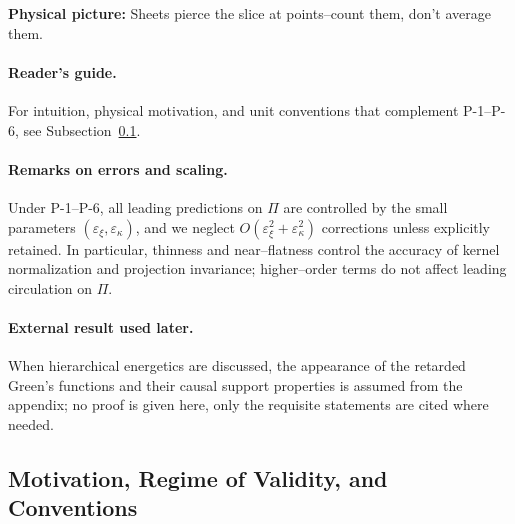\begin{physbox}\textbf{Physical picture:} Sheets pierce the slice at points--count them, don't average them.\end{physbox}

\paragraph{Reader's guide.}
For intuition, physical motivation, and unit conventions that complement P-1–P-6, see Subsection~\ref{sec:motivation-conventions}.

\paragraph{Remarks on errors and scaling.}
Under P-1–P-6, all leading predictions on $\Pi$ are controlled by the small parameters $(\varepsilon_\xi,\varepsilon_\kappa)$, and we neglect $O(\varepsilon_\xi^2+\varepsilon_\kappa^2)$ corrections unless explicitly retained. In particular, thinness and near–flatness control the accuracy of kernel normalization and projection invariance; higher–order terms do not affect leading circulation on $\Pi$.

\paragraph{External result used later.}
When hierarchical energetics are discussed, the appearance of the retarded Green's functions and their causal support properties is assumed from the appendix; no proof is given here, only the requisite statements are cited where needed.

\subsection{Motivation, Regime of Validity, and Conventions}
\label{sec:motivation-conventions}

